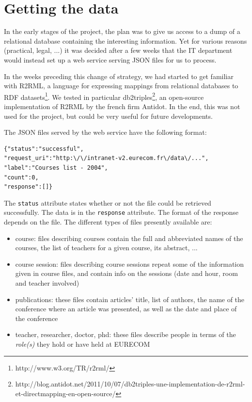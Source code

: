 \documentclass[a4paper,11pt]{report}
\begin{document}
\section{Getting the data} 
In the early stages of the project, the plan was to give us access to a dump of a relational database containing the interesting information. Yet for various reasons (practical, legal, ...) it was decided after a few weeks that the IT department would instead set up a web service serving JSON files for us to process. 

In the weeks preceding this change of strategy, we had started to get familiar with R2RML, a language for expressing mappings from relational databases to RDF datasets\footnote{http://www.w3.org/TR/r2rml/}. We tested in particular db2triples\footnote{http://blog.antidot.net/2011/10/07/db2triples-une-implementation-de-r2rml-et-directmapping-en-open-source/}, an open-source implementation of R2RML by the french firm Antidot. In the end, this was not used for the project, but could be very useful for future developments. 

The JSON files served by the web service have the following format: 
\begin{verbatim}
{"status":"successful",
"request_uri":"http:\/\/intranet-v2.eurecom.fr\/data\/...",
"label":"Courses list - 2004",
"count":0,
"response":[]}
\end{verbatim}
The \texttt{status} attribute states whether or not the file could be retrieved successfully. The data is in the \texttt{response} attribute. The format of the response depends on the file. The different types of files presently available are: 
\begin{itemize}
\item course: files describing courses contain the full and abbreviated names of the courses, the list of teachers for a given course, its abstract, ...
\item course session: files describing course sessions repeat some of the information given in course files, and contain info on the sessions (date and hour, room and teacher involved)
\item publications:  these files contain articles' title, list of authors, the name of the conference where an article was presented, as well as the date and place of the conference
\item teacher, researcher, doctor, phd: these files describe people in terms of the \emph{role(s)} they hold or have held at \mbox{EURECOM}
\end{itemize}
\end{document}
